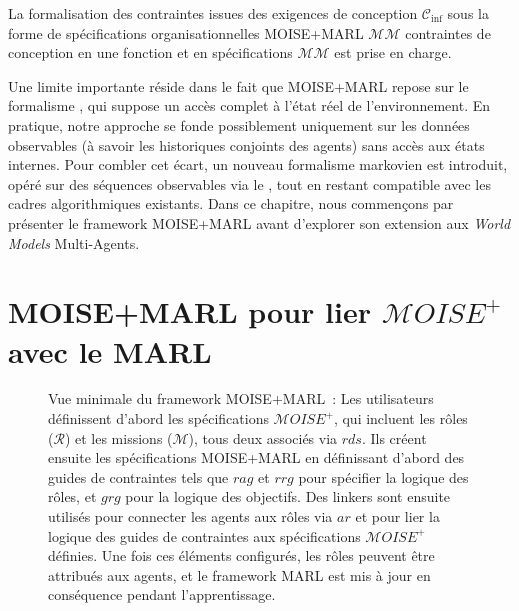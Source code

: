 La formalisation des contraintes issues des exigences de conception $\mathcal{C}_{\text{inf}}$ sous la forme de spécifications organisationnelles MOISE+MARL $\mathcal{MM}$ contraintes de conception en une fonction  et en spécifications $\mathcal{MM}$ est prise en charge.

\noindent Une limite importante réside dans le fait que MOISE+MARL repose sur le formalisme , qui suppose un accès complet à l'état réel de l'environnement. En pratique, notre approche se fonde possiblement uniquement sur les données observables (à savoir les historiques conjoints des agents) sans accès aux états internes. Pour combler cet écart, un nouveau formalisme markovien est introduit, opéré sur des séquences observables via le , tout en restant compatible avec les cadres algorithmiques  existants.
Dans ce chapitre, nous commençons par présenter le framework MOISE+MARL avant d'explorer son extension aux \textit{World Models} Multi-Agents.

\section{MOISE+MARL pour lier $\mathcal{M}OISE^+$ avec le MARL}

\begin{figure}[h!]
  \centering
  
  \caption[Vue minimale du framework MOISE+MARL]{Vue minimale du framework MOISE+MARL~: Les utilisateurs définissent d'abord les spécifications $\mathcal{M}OISE^+$, qui incluent les rôles ($\mathcal{R}$) et les missions ($\mathcal{M}$), tous deux associés via $rds$. Ils créent ensuite les spécifications MOISE+MARL en définissant d'abord des guides de contraintes tels que $rag$ et $rrg$ pour spécifier la logique des rôles, et $grg$ pour la logique des objectifs. Des linkers sont ensuite utilisés pour connecter les agents aux rôles via $ar$ et pour lier la logique des guides de contraintes aux spécifications $\mathcal{M}OISE^+$ définies. Une fois ces éléments configurés, les rôles peuvent être attribués aux agents, et le framework MARL est mis à jour en conséquence pendant l'apprentissage.
  }
  \label{fig:mm_synthesis}
\end{figure}

